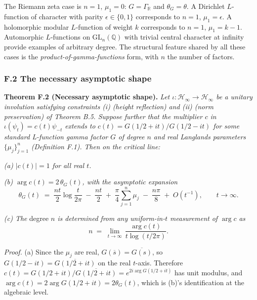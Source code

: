\documentclass[
  letterpaper,
  11pt]{article}
\theoremstyle{plain}
\theoremstyle{definition}
\theoremstyle{remark}
\begin{document}
The Riemann zeta case is \(n = 1\), \(\mu_1 = 0\): \(G = \Gamma_{\mathbb{R}}\) and \(\theta_G = \theta\). A Dirichlet \(L\)-function of character with parity \(\epsilon \in \{0, 1\}\) corresponds to \(n = 1\), \(\mu_1 = \epsilon\). A holomorphic modular \(L\)-function of weight \(k\) corresponds to \(n = 1\), \(\mu_1 = k - 1\). Automorphic \(L\)-functions on \(\mathrm{GL}_n(\mathbb{Q})\) with trivial central character at infinity provide examples of arbitrary degree. The structural feature shared by all these cases is the \emph{product-of-gamma-functions} form, with \(n\) the number of factors.

\subsubsection{F.2 The necessary asymptotic shape}\label{f.2-the-necessary-asymptotic-shape}

\textbf{Theorem F.2 (Necessary asymptotic shape).} \emph{Let \(\iota: \mathcal{H}_\infty \to \mathcal{H}_\infty\) be a unitary involution satisfying constraints (i) (height reflection) and (ii) (norm preservation) of Theorem B.5. Suppose further that the multiplier \(c\) in \(\iota(\psi_t) = c(t)\psi_{-t}\) extends to \(c(t) = G(1/2 + it)/G(1/2 - it)\) for some standard L-function gamma factor \(G\) of degree \(n\) and real Langlands parameters \(\{\mu_j\}_{j=1}^n\) (Definition F.1). Then on the critical line:}

\emph{(a) \(|c(t)| = 1\) for all real \(t\).}

\emph{(b) \(\arg c(t) = 2\,\theta_G(t)\), with the asymptotic expansion}
\[\theta_G(t) \;=\; \frac{nt}{2}\log\frac{t}{2\pi} \;-\; \frac{nt}{2} \;+\; \frac{\pi}{4}\sum_{j=1}^n \mu_j \;-\; \frac{n\pi}{8} \;+\; O(t^{-1}), \qquad t \to \infty.\]

\emph{(c) The} degree \emph{\(n\) is determined from any uniform-in-\(t\) measurement of \(\arg c\) as}
\[n \;=\; \lim_{t \to \infty}\,\frac{\arg c(t)}{t\log(t/2\pi)}.\]

\emph{Proof.} (a) Since the \(\mu_j\) are real, \(G(\overline{s}) = \overline{G(s)}\), so \(G(1/2 - it) = \overline{G(1/2 + it)}\) on the real \(t\)-axis. Therefore \(c(t) = G(1/2+it)/\overline{G(1/2+it)} = e^{2i\arg G(1/2+it)}\) has unit modulus, and \(\arg c(t) = 2\arg G(1/2 + it) = 2\theta_G(t)\), which is (b)'s identification at the algebraic level.
\end{document}
